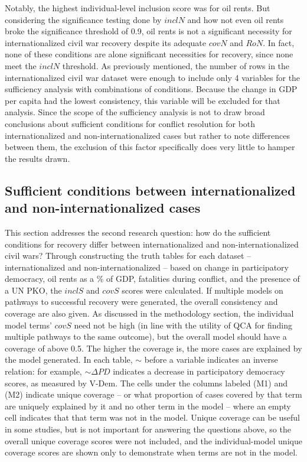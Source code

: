 \documentclass{article}
\begin{document}
Notably, the highest individual-level inclusion score was for oil rents. But considering the significance testing done by $inclN$ and how not even oil rents broke the significance threshold of 0.9, oil rents is not a significant necessity for internationalized civil war recovery despite its adequate $covN$ and $RoN$. In fact, none of these conditions are alone significant necessities for recovery, since none meet the $inclN$ threshold. As previously mentioned, the number of rows in the internationalized civil war dataset were enough to include only 4 variables for the sufficiency analysis with combinations of conditions. Because the change in GDP per capita had the lowest consistency, this variable will be excluded for that analysis. Since the scope of the sufficiency analysis is not to draw broad conclusions about sufficient conditions for conflict resolution for both internationalized and non-internationalized cases but rather to note differences between them, the exclusion of this factor specifically does very little to hamper the results drawn. 

\subsection{Sufficient conditions between internationalized and non-internationalized cases}
This section addresses the second research question: how do the sufficient conditions for recovery differ between internationalized and non-internationalized civil wars? Through constructing the truth tables for each dataset -- internationalized and non-internationalized -- based on change in participatory democracy, oil rents as a \% of GDP, fatalities during conflict, and the presence of a UN PKO, the $inclS$ and $covS$ scores were calculated. If multiple models on pathways to successful recovery were generated, the overall consistency and coverage are also given. As discussed in the methodology section, the individual model terms' $covS$ need not be high (in line with the utility of QCA for finding multiple pathways to the same outcome), but the overall model should have a coverage of above 0.5. The higher the coverage is, the more cases are explained by the model generated. In each table, $\sim$ before a variable indicates an inverse relation: for example, $\sim\Delta PD$ indicates a decrease in participatory democracy scores, as measured by V-Dem. The cells under the columns labeled (M1) and (M2) indicate unique coverage -- or what proportion of cases covered by that term are uniquely explained by it and no other term in the model -- where an empty cell indicates that that term was not in the model. Unique coverage can be useful in some studies, but is not important for answering the questions above, so the overall unique coverage scores were not included, and the individual-model unique coverage scores are shown only to demonstrate when terms are not in the model.
\end{document}

